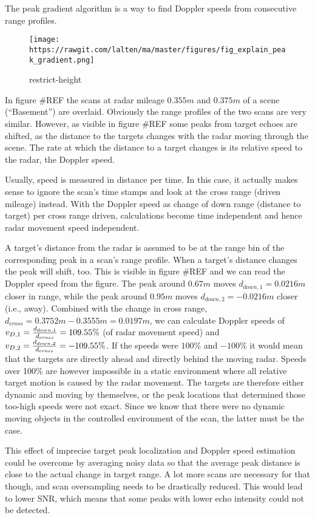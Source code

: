 The peak gradient algorithm is a way to find Doppler speeds from
consecutive range profiles.

\begin{figure}
\centering
\texttt{[image: https://rawgit.com/lalten/ma/master/figures/fig\_explain\_peak\_gradient.png]}
\caption{restrict-height}
\end{figure}

In figure \#REF the scans at radar mileage \(0.355m\) and \(0.375m\) of
a scene (``Basement'') are overlaid. Obviously the range profiles of the
two scans are very similar. However, as visible in figure \#REF some
peaks from target echoes are shifted, as the distance to the targets
changes with the radar moving through the scene. The rate at which the
distance to a target changes is its relative speed to the radar, the
Doppler speed.

Usually, speed is measured in distance per time. In this case, it
actually makes sense to ignore the scan's time stamps and look at the
cross range (driven mileage) instead. With the Doppler speed as change
of down range (distance to target) per cross range driven, calculations
become time independent and hence radar movement speed independent.

A target's distance from the radar is assumed to be at the range bin of
the corresponding peak in a scan's range profile. When a target's
distance changes the peak will shift, too. This is visible in figure
\#REF and we can read the Doppler speed from the figure. The peak around
\(0.67m\) moves \(d_{down,1} = 0.0216m\) closer in range, while the peak
around \(0.95m\) moves \(d_{down,2} = -0.0216m\) closer (i.e., away).
Combined with the change in cross range,
\(d_{cross} = 0.3752m - 0.3555m = 0.0197m\), we can calculate Doppler
speeds of \(v_{D,1} = {d_{down,1} \over{d_{cross}}} = 109.55 \%\) (of
radar movement speed) and
\(v_{D,2} = {d_{down,2} \over{d_{cross}}} = -109.55 \%\). If the speeds
were \(100\%\) and \(-100\%\) it would mean that the targets are directly
ahead and directly behind the moving radar. Speeds over 100\% are
however impossible in a static environment where all relative target
motion is caused by the radar movement. The targets are therefore either
dynamic and moving by themselves, or the peak locations that determined
those too-high speeds were not exact. Since we know that there were no
dynamic moving objects in the controlled environment of the scan, the
latter must be the case.

This effect of imprecise target peak localization and Doppler speed
estimation could be overcome by averaging noisy data so that the average
peak distance is close to the actual change in target range. A lot more
scans are necessary for that though, and scan oversampling needs to be
drastically reduced. This would lead to lower SNR, which means that some
peaks with lower echo intensity could not be detected.

